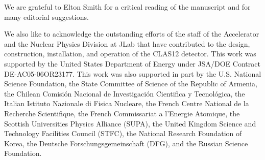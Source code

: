 \documentclass[final,3p,twocolumn]{elsarticle}
\begin{document}
\vspace{0.3cm}

\vspace{0.3cm}

We are grateful to Elton Smith for a critical reading of the manuscript and for many editorial suggestions. 
\vspace{0.3cm}

We also like to acknowledge the outstanding efforts of the staff of the Accelerator and the Nuclear Physics
Division at JLab that have contributed to the design, construction, installation, and operation of the CLAS12
detector. This work was supported by the United States Department of Energy under JSA/DOE Contract
DE-AC05-06OR23177. This work was also supported in part by the U.S. National Science Foundation, the State
Committee of Science of the Republic of Armenia, the Chilean Comisi\'on Nacional de Investigaci\'on Cientifica y
Tecnol\'ogica, the Italian Istituto Nazionale di Fisica Nucleare, the French Centre National de la Recherche
Scientifique, the French Commissariat a l'Energie Atomique, the Scottish Universities Physics Alliance (SUPA),
the United Kingdom Science and Technology Facilities Council (STFC), the National Research Foundation of Korea,
the Deutsche Forschungsgemeinschaft (DFG), and the Russian Science Foundation. 
\end{document}
